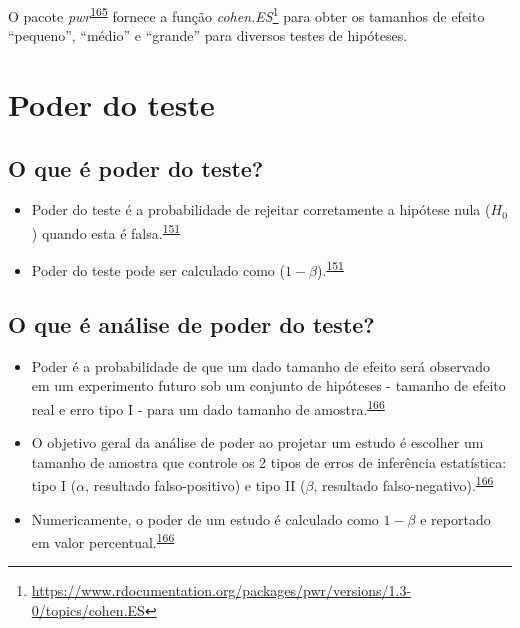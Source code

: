 \documentclass[
  a4paper,
]{book}
\renewcommand{\href}[2]{#2\footnote{\url{#1}}}
\newenvironment{infobox}[1]
  {
  \begin{itemize}
  \renewcommand{\labelitemi}{
    \raisebox{-.7\height}[0pt][0pt]{
      {\setkeys{Gin}{width=3em,keepaspectratio}
        \texttt{[image: \#1]}}
    }
  }
  \setlength{\fboxsep}{1em}
  \begin{blackbox}
  \item
  }
  {
  \end{blackbox}
  \end{itemize}
  }
\begin{document}
\begin{infobox}{images/Rlogo}
O pacote \emph{pwr}\textsuperscript{\protect\hyperlink{ref-pwr}{165}} fornece a função \href{https://www.rdocumentation.org/packages/pwr/versions/1.3-0/topics/cohen.ES}{\emph{cohen.ES}} para obter os tamanhos de efeito ``pequeno'', ``médio'' e ``grande'' para diversos testes de hipóteses.

\end{infobox}

\hypertarget{poder-teste}{%
\section{Poder do teste}\label{poder-teste}}

\hypertarget{o-que-uxe9-poder-do-teste}{%
\subsection{O que é poder do teste?}\label{o-que-uxe9-poder-do-teste}}

\begin{itemize}
\item
  Poder do teste é a probabilidade de rejeitar corretamente a hipótese nula (\(H_{0}\)) quando esta é falsa.\textsuperscript{\protect\hyperlink{ref-Curran-Everett2009}{151}}
\item
  Poder do teste pode ser calculado como (\(1 - \beta\)).\textsuperscript{\protect\hyperlink{ref-Curran-Everett2009}{151}}
\end{itemize}

\hypertarget{o-que-uxe9-anuxe1lise-de-poder-do-teste}{%
\subsection{O que é análise de poder do teste?}\label{o-que-uxe9-anuxe1lise-de-poder-do-teste}}

\begin{itemize}
\item
  Poder é a probabilidade de que um dado tamanho de efeito será observado em um experimento futuro sob um conjunto de hipóteses - tamanho de efeito real e erro tipo I - para um dado tamanho de amostra.\textsuperscript{\protect\hyperlink{ref-heckman2022}{166}}
\item
  O objetivo geral da análise de poder ao projetar um estudo é escolher um tamanho de amostra que controle os 2 tipos de erros de inferência estatística: tipo I (\(\alpha\), resultado falso-positivo) e tipo II (\(\beta\), resultado falso-negativo).\textsuperscript{\protect\hyperlink{ref-heckman2022}{166}}
\item
  Numericamente, o poder de um estudo é calculado como \(1-\beta\) e reportado em valor percentual.\textsuperscript{\protect\hyperlink{ref-heckman2022}{166}}
\end{itemize}
\end{document}
